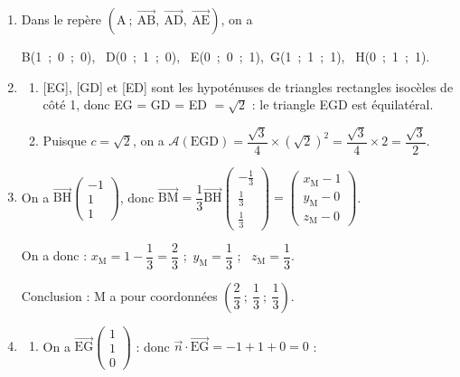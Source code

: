 \documentclass[10pt]{article}
\providecommand{\vect}[1]{\overrightarrow{#1}}
\begin{document}
\begin{enumerate}
\item 
Dans le repère $\left(\text{A}~;~\vect{\text{AB}},~\vect{\text{AD}},~\vect{\text{AE}}\right)$, on a 

B(1~;~0~;~0), \, D(0~;~1~;~0), \, E(0~;~0~;~1),\, G(1~;~1~;~1), \, H(0~;~1~;~1).
\item 
	\begin{enumerate}
		\item{}  
[EG], [GD] et [ED] sont les hypoténuses de triangles rectangles isocèles de côté 1, donc EG = GD = ED $= \sqrt{2}$ : le triangle EGD est équilatéral.
		\item 
		

Puisque $c = \sqrt{2}$, on a $\mathcal{A}(\text{EGD}) = \dfrac{\sqrt{3}}{4}\times \left(\sqrt{2}\right)^2 = \dfrac{\sqrt{3}}{4}\times 2 = \dfrac{\sqrt{3}}{2}$.
	\end{enumerate}
	
\item 

On a $\vect{\text{BH}}\begin{pmatrix}- 1\\1\\1\end{pmatrix}$, donc $\vect{\text{BM}} = \dfrac{1}{3}\vect{\text{BH}}\begin{pmatrix}- \frac{1}{3}\\[3pt]\frac{1}{3}\\[3pt]\frac{1}{3}\end{pmatrix} = \begin{pmatrix}x_{\text{M}} - 1\\y_{\text{M}}- 0\\z_{\text{M}}- 0\end{pmatrix}$.

On a donc : 
$x_{\text{M}} = 1 - \dfrac{1}{3} = \dfrac{2}{3}$ ;\,
$y_{\text{M}} = \dfrac{1}{3} $ ; \,
$z_{\text{M}} = \dfrac{1}{3}$.

Conclusion : M a pour coordonnées $\left(\dfrac{2}{3}~;~\dfrac{1}{3}~; ~\dfrac{1}{3}\right)$.
\item
	\begin{enumerate}
		\item 
		
On a $\vect{\text{EG}}\begin{pmatrix}1\\1\\0\end{pmatrix}$ : donc $\vect{n} \cdot \vect{\text{EG}} = - 1 +1 + 0 = 0$ :


\end{enumerate}
\end{enumerate}
\end{document}
